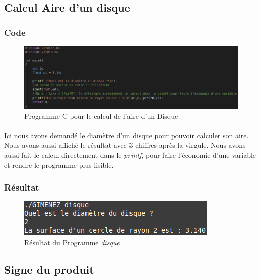 \documentclass[10pt,a4paper]{article}
\begin{document}
\subsection{Calcul Aire d'un disque}
\subsubsection{Code}
    \begin{figure}[h]
	\begin{center}
	\includegraphics[scale=.3]{images/disque_c}
	\end{center}
	\caption{Programme C pour le calcul de l'aire d'un Disque}
	\end{figure}
\paragraph{}
Ici nous avons demandé le diamètre d'un disque pour pouvoir calculer son aire. Nous avons aussi affiché le résultat avec 3 
chiffres après la virgule. Nous avons aussi fait le calcul directement dans le \emph{printf}, pour faire l'économie d'une 
variable et rendre le programme plus lisible.
\pagebreak
\subsubsection{Résultat}
	\begin{figure}[h]
	\begin{center}
	\includegraphics[scale=.3]{images/disque_ex}
	\end{center}
	\caption{Résultat du Programme \emph{disque}}
	\end{figure}


\subsection{Signe du produit}
\end{document}
